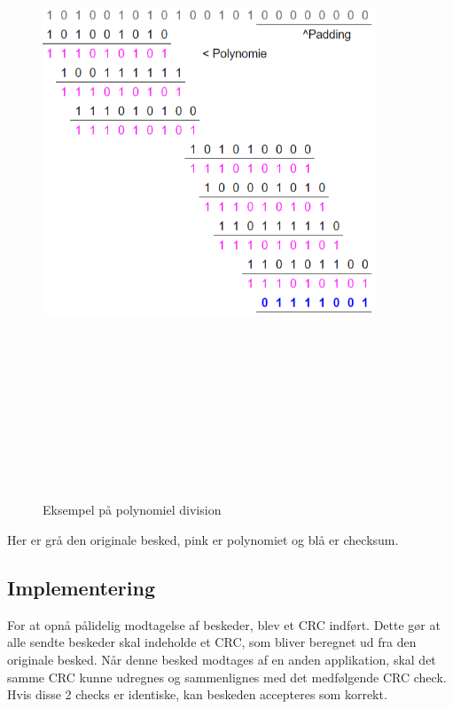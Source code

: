 \begin{figure}[ht]
	\centering
	\includegraphics[width=10cm,height=20cm,keepaspectratio]{pictures/Poly.png}
	\caption{Eksempel på polynomiel division}
	\label{fig:poly}
\end{figure}
\newline
Her er grå den originale besked, pink er polynomiet og blå er checksum.

\subsection{Implementering}
For at opnå pålidelig modtagelse af beskeder, blev et CRC indført. Dette gør at alle sendte beskeder skal indeholde et CRC, som bliver beregnet ud fra den originale besked.
\newline
Når denne besked modtages af en anden applikation, skal det samme CRC kunne udregnes og sammenlignes med det medfølgende CRC check. Hvis disse 2 checks er identiske, kan beskeden accepteres som korrekt.
\hfill \break

